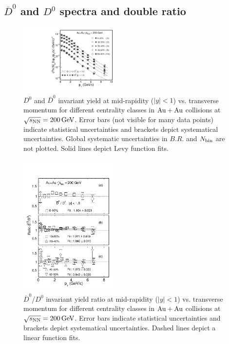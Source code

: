 \documentclass[%
 reprint,	
 amsmath,amssymb,
 aps,
 prc,
]{revtex4-1}
\begin{document}
\subsection{\label{result:D0barD0ratio} $\overline{D}^{0}$ and $D^{0}$ spectra and double ratio}

\begin{figure}
\centering
\includegraphics[width=0.45\textwidth]{fig/D0_spectra_bothposneg.pdf}
\caption{$D^{0}$ and $\overline{D}^{0}$ invariant yield at mid-rapidity ($|y|<1$) vs. transverse momentum for different centrality classes in ${\rm{Au + Au}}$ collisions at ${\sqrt{s_{\rm NN}} = \rm{200\,GeV}}$. Error bars (not visible for many data points) indicate statistical uncertainties and brackets depict systematical uncertainties. Global systematic uncertainties in $B.R.$ and $N_{\rm bin}$ are not plotted. Solid lines depict Levy function fits.}
\label{fig:D0_spectra_bothposneg} 
\end{figure}

\begin{figure}
\centering
\includegraphics[width=0.45\textwidth]{fig/D0_spectra_ratioposneg_fit.pdf}
\caption{$\overline{D}^{0}$/$D^{0}$ invariant yield ratio at mid-rapidity ($|y|<1$) vs. transverse momentum for different centrality classes in ${\rm{Au + Au}}$ collisions at ${\sqrt{s_{\rm NN}} = \rm{200\,GeV}}$. Error bars indicate statistical uncertainties and brackets depict systematical uncertainties. Dashed lines depict a linear function fits.}
\label{fig:D0_spectra_ratioposneg} 
\end{figure}
\end{document}
